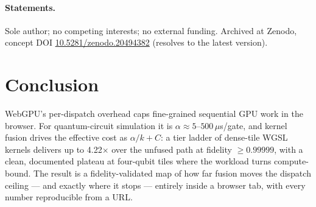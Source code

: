 \documentclass[11pt]{article}
\begin{document}
\paragraph{Statements.} Sole author; no competing interests; no external
funding. Archived at Zenodo, concept DOI
\href{https://doi.org/10.5281/zenodo.20494382}{10.5281/zenodo.20494382}
(resolves to the latest version).

\section{Conclusion}

WebGPU's per-dispatch overhead caps fine-grained sequential GPU work in the
browser. For quantum-circuit simulation it is $\alpha \approx 5$--$500\,\mu$s/gate,
and kernel fusion drives the effective cost as $\alpha/k + C$: a tier ladder of
dense-tile WGSL kernels delivers up to 4.22$\times$ over the unfused path at
fidelity $\ge 0.99999$, with a clean, documented plateau at four-qubit tiles
where the workload turns compute-bound. The result is a fidelity-validated map
of how far fusion moves the dispatch ceiling --- and exactly where it stops ---
entirely inside a browser tab, with every number reproducible from a URL.



\end{document}

